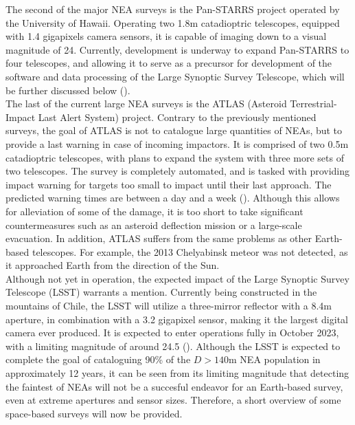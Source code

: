 The second of the major NEA surveys is the Pan-STARRS project operated by the University of Hawaii. Operating two 1.8m catadioptric telescopes, equipped with 1.4 gigapixels camera sensors, it is capable of imaging down to a visual magnitude of 24. Currently, development is underway to expand Pan-STARRS to four telescopes, and allowing it to serve as a precursor for development of the software and data processing of the Large Synoptic Survey Telescope, which will be further discussed below (\cite{PANSTARRS}).\\

The last of the current large NEA surveys is the ATLAS (Asteroid Terrestrial-Impact Last Alert System) project. Contrary to the previously mentioned surveys, the goal of ATLAS is not to catalogue large quantities of NEAs, but to provide a last warning in case of incoming impactors. It is comprised of two 0.5m catadioptric telescopes, with plans to expand the system with three more sets of two telescopes. The survey is completely automated, and is tasked with providing impact warning for targets too small to impact until their last approach. The predicted warning times are between a day and a week (\cite{ATLAS}). Although this allows for alleviation of some of the damage, it is too short to take significant countermeasures such as an asteroid deflection mission or a large-scale evacuation. In addition, ATLAS suffers from the same problems as other Earth-based telescopes. For example, the 2013 Chelyabinsk meteor was not detected, as it approached Earth from the direction of the Sun.\\

Although not yet in operation, the expected impact of the Large Synoptic Survey Telescope (LSST) warrants a mention. Currently being constructed in the mountains of Chile, the LSST will utilize a three-mirror reflector with a 8.4m aperture, in combination with a 3.2 gigapixel sensor, making it the largest digital camera ever produced. It is expected to enter operations fully in October 2023, with a limiting magnitude of around 24.5 (\cite{LSST}). Although the LSST is expected to complete the goal of cataloguing 90\% of the $D > 140 \mathrm{m}$ NEA population in approximately 12 years, it can be seen from its limiting magnitude that detecting the faintest of NEAs will not be a succesful endeavor for an Earth-based survey, even at extreme apertures and sensor sizes. Therefore, a short overview of some space-based surveys will now be provided.\\

